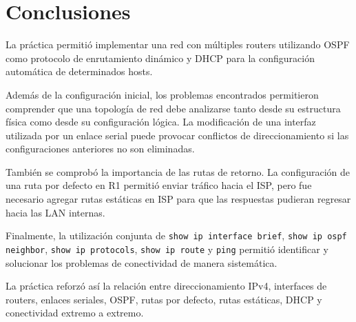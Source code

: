 \documentclass[12pt,a4paper]{article}
\begin{document}
\section{Conclusiones}

La práctica permitió implementar una red con múltiples routers utilizando OSPF como protocolo de enrutamiento dinámico y DHCP para la configuración automática de determinados hosts.

Además de la configuración inicial, los problemas encontrados permitieron comprender que una topología de red debe analizarse tanto desde su estructura física como desde su configuración lógica. La modificación de una interfaz utilizada por un enlace serial puede provocar conflictos de direccionamiento si las configuraciones anteriores no son eliminadas.

También se comprobó la importancia de las rutas de retorno. La configuración de una ruta por defecto en R1 permitió enviar tráfico hacia el ISP, pero fue necesario agregar rutas estáticas en ISP para que las respuestas pudieran regresar hacia las LAN internas.

Finalmente, la utilización conjunta de \texttt{show ip interface brief}, \texttt{show ip ospf neighbor}, \texttt{show ip protocols}, \texttt{show ip route} y \texttt{ping} permitió identificar y solucionar los problemas de conectividad de manera sistemática.

La práctica reforzó así la relación entre direccionamiento IPv4, interfaces de routers, enlaces seriales, OSPF, rutas por defecto, rutas estáticas, DHCP y conectividad extremo a extremo.
\end{document}
